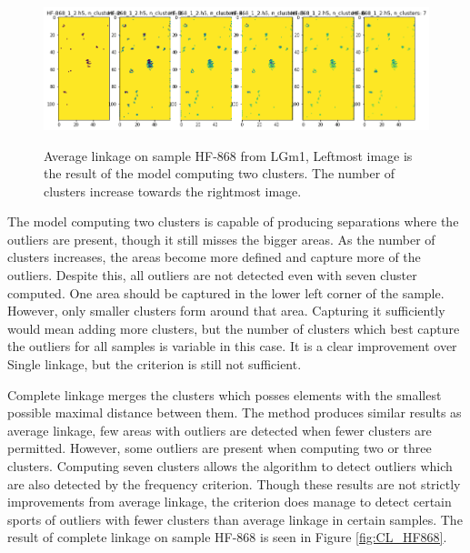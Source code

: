 \begin{figure}[H]

    \centering
{\includegraphics[width=15cm]{images/Average_linkage/LGm-1/HF-868_1_2.h5_0.png} }
\caption{Average linkage on sample HF-868 from LGm1, Leftmost image is the result of the model computing two clusters. The number of clusters increase towards the rightmost image.\label{fig:AL_HF868}}%

\end{figure}

The model computing two clusters is capable of producing separations where the outliers are present, though it still misses the bigger areas. As the number of clusters increases, the areas become more defined and capture more of the outliers. Despite this, all outliers are not detected even with seven cluster computed. One area should be captured in the lower left corner of the sample. However, only smaller clusters form around that area. Capturing it sufficiently would mean adding more clusters, but the number of clusters which best capture the outliers for all samples is variable in this case. It is a clear improvement over Single linkage, but the criterion is still not sufficient.

Complete linkage merges the clusters which posses elements with the smallest possible maximal distance between them. The method produces similar results as average linkage, few areas with outliers are detected when fewer clusters are permitted. However, some outliers are present when computing two or three clusters. Computing seven clusters allows the algorithm to detect outliers which are also detected by the frequency criterion. Though these results are not strictly improvements from average linkage, the criterion does manage to detect certain sports of outliers with fewer clusters than average linkage in certain samples. The result of complete linkage on sample HF-868 is seen in Figure \ref{fig:CL_HF868}.

